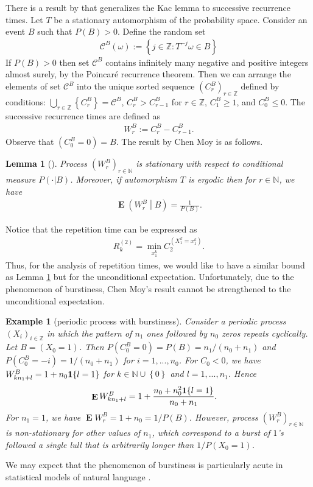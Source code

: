 \documentclass[a4paper,12pt]{article}
\newcommand{\okra}[1]{\left( #1 \right)}
\newcommand{\klam}[1]{\left\{ #1 \right\}}
\DeclareMathOperator{\mean}{\mathbf{E}}
\newcommand{\boole}[1]{{\bf 1}{\klam{#1}}}
\newtheorem{example}{Example}
\newtheorem{lemma}{Lemma}
\begin{document}
There is a result by \citeauthor{ChenMoy59} that generalizes the Kac
lemma to successive recurrence times.  Let $T$ be a stationary
automorphism of the probability space.  Consider an event $B$ such
that $P(B)>0$. Define the random set
\begin{align}
  \mathcal{C}^B(\omega):=\klam{j\in\mathbb{Z}: T^{-j}\omega\in B}
\end{align}
If $P(B)>0$ then set $\mathcal{C}^B$ contains infinitely many negative
and positive integers almost surely, by the Poincar\'e recurrence
theorem. Then we can arrange the elements of set $\mathcal{C}^B$ into
the unique sorted sequence $(C^B_r)_{r\in\mathbb{Z}}$ defined by
conditions: $\bigcup_{r\in\mathbb{Z}}\klam{C^B_r}=\mathcal{C}^B$,
$C^B_r>C^B_{r-1}$ for $r\in\mathbb{Z}$, $C^B_1\ge 1$, and
$C^B_0\le 0$.  The successive recurrence times are defined as
\begin{align}
  \label{Successive}
  W^B_r:=C^B_r-C^B_{r-1}.
\end{align}
Observe that $(C^B_0=0)=B$. The result by Chen Moy is as follows.
\begin{lemma}[\citep{ChenMoy59}]
  \label{theoChenMoy}
  Process $(W^B_r)_{r\in\mathbb{N}}$ is stationary with respect to
  conditional measure $P(\cdot|B)$. Moreover, if automorphism $T$
  is ergodic then for $r\in\mathbb{N}$, we have
  \begin{align}
    \mean\okra{W^B_r\middle|B}
    =
    \frac{1}{P(B)}.
  \end{align}
\end{lemma}

Notice that the repetition time can be expressed as
\begin{align}
  R^{(2)}_k=\min_{x_1^k} C^{(X_1^k=x_1^k)}_2.
\end{align}
Thus, for the analysis of repetition times, we would like to have a
similar bound as Lemma \ref{theoChenMoy} but for the unconditional
expectation. Unfortunately, due to the phenomenon of burstiness, Chen
Moy's result cannot be strengthened to the unconditional expectation.
\begin{example}[periodic process with burstiness]
  Consider a periodic process $(X_i)_{i\in\mathbb{Z}}$ in which the
  pattern of $n_1$ ones followed by $n_0$ zeros repeats
  cyclically. Let $B=(X_0=1)$. Then $P(C^B_0=0)=P(B)=n_1/(n_0+n_1)$
  and $P(C^B_0=-i)=1/(n_0+n_1)$ for $i=1,...,n_0$. For $C_0<0$, we
  have $W^B_{kn_1+l}=1+n_0\boole{l=1}$ for
  $k\in\mathbb{N}\cup\klam{0}$ and $l=1,...,n_1$. Hence
\begin{align}
  \mean W^B_{kn_1+l}&=1+\frac{n_0+n_0^2\boole{l=1}}{n_0+n_1}.
\end{align}
For $n_1=1$, we have $\mean W^B_r=1+n_0=1/P(B)$. However, process
$(W^B_r)_{r\in\mathbb{N}}$ is non-stationary for other values of
$n_1$, which correspond to a burst of $1$'s followed a single lull
that is arbitrarily longer than $1/P(X_0=1)$.
\end{example}
We may expect that the phenomenon of burstiness is particularly acute
in statistical models of natural language
\citep{Katz96,AltmannPierrehumbertMotter09,Debowski15f}.
\end{document}
